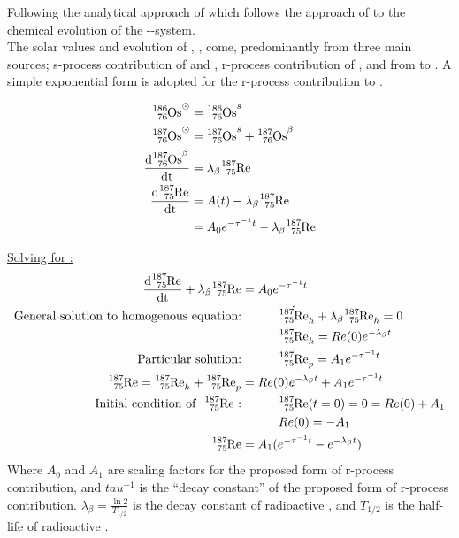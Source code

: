 
\renewcommand{\d}[1]{\frac{\textrm{d}#1}{\textrm{dt}}}
\newcommand{\pd}[2]{\frac{\partial #1}{\partial #2}}

Following the analytical approach of  which follows the approach of  to the chemical evolution of the --system. \\
The solar values and evolution of , ,  come, predominantly from three main sources;
s-process contribution of  and , r-process contribution of ,
and \betadecay from  to .
A simple exponential form is adopted for the r-process contribution to .

\begin{align*}
  \os{186}^\odot &= \os{186}^s \\
  \os{187}^\odot &= \os{187}^s + \os{187}^\beta \\
  \d{\os{187}^\beta} &= \lambda_\beta\re{187} \\
  \d{\re{187}} &= A(t) - \lambda_\beta\re{187} \\
  &= A_0e^{-\tau^{-1}t} - \lambda_\beta\re{187} \\
\end{align*}

\underline{Solving for :}
\begin{align*}
  \d{\re{187}} + \lambda_\beta \re{187} &= A_0e^{-\tau^{-1}t} \\
  \textrm{General solution to homogenous equation:}
  & \hspace{3em} \dot{\re{187}}_h + \lambda_\beta \re{187}_h = 0 \\
  & \hspace{3em} \re{187}_h = Re(0) e^{-\lambda_\beta t} \\
  \textrm{Particular solution:}
  & \hspace{3em} \dot{\re{187}}_p = A_1 e^{-\tau^{-1}t} \\
  \re{187} = \re{187}_h + \re{187}_p &= Re(0) e^{-\lambda_\beta t} + A_1 e^{-\tau^{-1}t} \\
  \textrm{Initial condition of \re{187}:}
  & \hspace{3em} \re{187}(t=0) = 0 = Re(0) + A_1 \\
  & \hspace{3em} Re(0) = - A_1 \\
  \re{187} &= A_1 (e^{-\tau^{-1}t} - e^{-\lambda_\beta t}) \\
\end{align*}
Where $A_0$ and $A_1$ are scaling factors for the proposed form of r-process contribution, and $tau^{-1}$ is the
``decay constant'' of the proposed form of r-process contribution.
$\lambda_\beta=\frac{\ln 2}{T_{1/2}}$ is the decay constant of radioactive , and $T_{1/2}$ is the half-life of radioactive .

